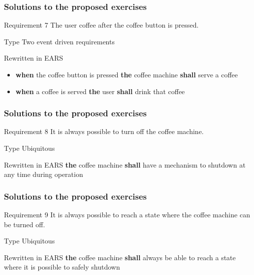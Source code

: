 \documentclass[aspectratio=169]{beamer}
\newcommand{\earsu}[2]{{\bf \color{mypurple}the} {#1} {\bf \color{mypurple}shall} {#2}}
\newcommand{\earse}[3]{{\bf \color{mygreen}when} {#1} {\bf \color{mypurple}the} {#2} {\bf \color{mypurple}shall} {#3}}
\begin{document}
\begin{frame}
  \frametitle{Solutions to the proposed exercises}
  \begin{block}{Requirement 7}
    The user  \alert{coffee} after the \alert{coffee button} is pressed.
  \end{block}
  \begin{block}{Type}
   Two event driven requirements
  \end{block}
  \begin{block}{Rewritten in EARS}
  \begin{itemize}
    \item \earse{the coffee button is pressed}{coffee machine}{serve a coffee}
    \item \earse{a coffee is served}{user}{drink that coffee}
  \end{itemize}
   
  \end{block}
\end{frame}

\begin{frame}
  \frametitle{Solutions to the proposed exercises}
  \begin{block}{Requirement 8}
    It is always possible to \alert{turn off} the coffee machine.
  \end{block}
  \begin{block}{Type}
   Ubiquitous
  \end{block}
  \begin{block}{Rewritten in EARS}
   \earsu{coffee machine}{have a mechanism to shutdown at any time during operation}
  \end{block}
\end{frame}

\begin{frame}
  \frametitle{Solutions to the proposed exercises}
  \begin{block}{Requirement 9}
    It is always possible to reach a state where the coffee machine can be \alert{turned off}.
  \end{block}
  \begin{block}{Type}
   Ubiquitous
  \end{block}
  \begin{block}{Rewritten in EARS}
   \earsu{coffee machine}{always be able to reach a state where it is possible to safely shutdown}
  \end{block}
\end{frame}
\end{document}
